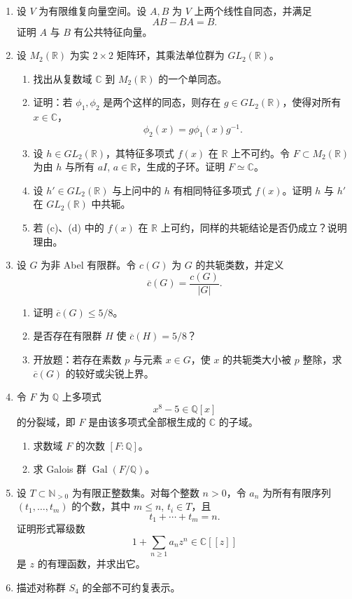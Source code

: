 \documentclass[UTF8,12pt]{ctexart}
\begin{document}
\begin{enumerate}[label=\textbf{\arabic*.},leftmargin=2.2em]
\item 设 \(V\) 为有限维复向量空间。设 \(A,B\) 为 \(V\) 上两个线性自同态，并满足
\[
AB-BA=B.
\]
证明 \(A\) 与 \(B\) 有公共特征向量。

\item 设 \(M_2(\mathbb R)\) 为实 \(2\times2\) 矩阵环，其乘法单位群为 \(GL_2(\mathbb R)\)。
\begin{enumerate}[label=\textbf{(\alph*)},leftmargin=2.4em]
\item 找出从复数域 \(\mathbb C\) 到 \(M_2(\mathbb R)\) 的一个单同态。
\item 证明：若 \(\phi_1,\phi_2\) 是两个这样的同态，则存在 \(g\in GL_2(\mathbb R)\)，使得对所有 \(x\in\mathbb C\)，
\[
\phi_2(x)=g\phi_1(x)g^{-1}.
\]
\item 设 \(h\in GL_2(\mathbb R)\)，其特征多项式 \(f(x)\) 在 \(\mathbb R\) 上不可约。令 \(F\subset M_2(\mathbb R)\) 为由 \(h\) 与所有 \(aI\), \(a\in\mathbb R\)，生成的子环。证明 \(F\simeq\mathbb C\)。
\item 设 \(h'\in GL_2(\mathbb R)\) 与上问中的 \(h\) 有相同特征多项式 \(f(x)\)。证明 \(h\) 与 \(h'\) 在 \(GL_2(\mathbb R)\) 中共轭。
\item 若 (c)、(d) 中的 \(f(x)\) 在 \(\mathbb R\) 上可约，同样的共轭结论是否仍成立？说明理由。
\end{enumerate}

\item 设 \(G\) 为非 Abel 有限群。令 \(c(G)\) 为 \(G\) 的共轭类数，并定义
\[
\overline c(G)=\frac{c(G)}{|G|}.
\]
\begin{enumerate}[label=\textbf{(\alph*)},leftmargin=2.4em]
\item 证明 \(\overline c(G)\le 5/8\)。
\item 是否存在有限群 \(H\) 使 \(\overline c(H)=5/8\)？
\item 开放题：若存在素数 \(p\) 与元素 \(x\in G\)，使 \(x\) 的共轭类大小被 \(p\) 整除，求 \(\overline c(G)\) 的较好或尖锐上界。
\end{enumerate}

\item 令 \(F\) 为 \(\mathbb Q\) 上多项式
\[
x^8-5\in\mathbb Q[x]
\]
的分裂域，即 \(F\) 是由该多项式全部根生成的 \(\mathbb C\) 的子域。
\begin{enumerate}[label=\textbf{(\alph*)},leftmargin=2.4em]
\item 求数域 \(F\) 的次数 \([F:\mathbb Q]\)。
\item 求 Galois 群 \(\operatorname{Gal}(F/\mathbb Q)\)。
\end{enumerate}

\item 设 \(T\subset\mathbb N_{>0}\) 为有限正整数集。对每个整数 \(n>0\)，令 \(a_n\) 为所有有限序列 \((t_1,\ldots,t_m)\) 的个数，其中 \(m\le n\), \(t_i\in T\)，且
\[
t_1+\cdots+t_m=n.
\]
证明形式幂级数
\[
1+\sum_{n\ge1}a_nz^n\in\mathbb C[[z]]
\]
是 \(z\) 的有理函数，并求出它。

\item 描述对称群 \(S_4\) 的全部不可约复表示。
\end{enumerate}
\end{document}

